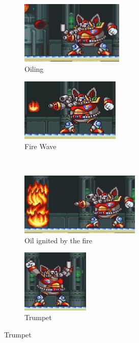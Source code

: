 \begin{figure}[htp]
	\centering
	\begin{subfigure}{0.4\textwidth}
		\centering
		\includegraphics[height=3cm]{figures/X1/Flame_mammoth/Mammoth_oil.jpg}
		\caption{Oiling}
	\end{subfigure}
	\begin{subfigure}{0.4\textwidth}
		\centering
		\includegraphics[height=3cm]{figures/X1/Flame_mammoth/Mammoth_fire.jpg}
		\caption{Fire Wave}
	\end{subfigure}\\
	\begin{subfigure}{0.5\textwidth}
		\centering
		\includegraphics[height=3cm]{figures/X1/Flame_mammoth/Mammoth_oil_fire.jpg}
		\caption{Oil ignited by the fire}
	\end{subfigure}
	\begin{subfigure}{0.3\textwidth}
		\centering
		\includegraphics[height=3cm]{figures/X1/Flame_mammoth/Mammoth_trunk.jpg}
		\caption{Trumpet}
	\end{subfigure}
	

\end{figure}
